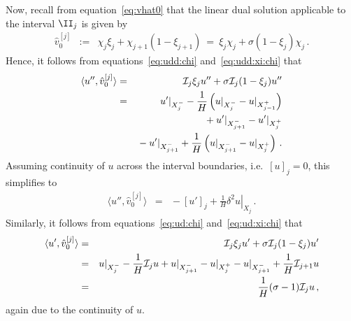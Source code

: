 \documentclass[12pt,a5paper]{article}
\begin{document}
Now, recall from equation~\eqref{eq:vhat0} that the linear dual solution applicable to the interval $\II_j$ is given by
\begin{eqnarray}
\hat{v}_0^{[j]} & := & \chi_j\xi_j + \chi_{j+1}(1-\xi_{j+1})~=~\xi_j\chi_j+\sigma(1-\xi_j)\chi_j\,.
\end{eqnarray}
Hence, it follows from equations~\eqref{eq:udd:chi} and~\eqref{eq:udd:xi:chi} that
\begin{eqnarray}
\langle u'',\hat{v}_0^{[j]}\rangle & = & 
{\cal I}_j\xi_ju''+\sigma{\cal I}_j(1-\xi_j)u''
\nonumber\\
& = & u'|_{X^-_j}-\frac{1}{H}\left(u|_{X^-_j} - u|_{X^+_{j-1}}\right)
\nonumber\\&&
{}+u'|_{X^-_{j+1}} - u'|_{X^+_j}
\nonumber\\&&
{}-u'|_{X^-_{j+1}}+\frac{1}{H}\left(u|_{X^-_{j+1}} - u|_{X^+_j}\right)\,.
\end{eqnarray}
Assuming continuity of $u$ across the interval boundaries, i.e.\ $[u]_j=0$, this simplifies to
\begin{eqnarray}
\langle u'',\hat{v}_0^{[j]}\rangle & = & 
{}-\left[u'\right]_j+\frac{1}{H}\left.\delta^2u\right|_{X_j}\,.
\label{eq:udd:vhat0}
\end{eqnarray}
Similarly, it follows from equations~\eqref{eq:ud:chi} and~\eqref{eq:ud:xi:chi} that
\begin{eqnarray}
\langle u',\hat{v}_0^{[j]}\rangle & = & 
{\cal I}_j\xi_ju'+\sigma{\cal I}_j(1-\xi_j)u'
\nonumber\\
& = & u|_{X^-_j}-\frac{1}{H}{\cal I}_ju
+u|_{X^-_{j+1}} - u|_{X^+_j}
-u|_{X^-_{j+1}}+\frac{1}{H}{\cal I}_{j+1}u
\nonumber\\
& = & \frac{1}{H}(\sigma-1){\cal I}_ju\,,
\label{eq:ud:vhat0}
\end{eqnarray}
again due to the continuity of $u$.

\end{document}
